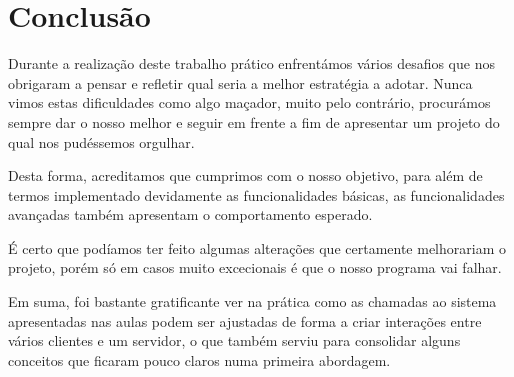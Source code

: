 \documentclass[12pt,a4paper]{report}
\begin{document}
\chapter{Conclusão}

    Durante a realização deste trabalho prático enfrentámos vários desafios que nos obrigaram a pensar e refletir qual seria a melhor estratégia a adotar. Nunca vimos estas dificuldades como algo maçador, muito pelo contrário, procurámos sempre dar o nosso melhor e seguir em frente a fim de apresentar um projeto do qual nos pudéssemos orgulhar.

    Desta forma, acreditamos que cumprimos com o nosso objetivo, para além de termos implementado devidamente as funcionalidades básicas, as funcionalidades avançadas também apresentam o comportamento esperado.

    É certo que podíamos ter feito algumas alterações que certamente melhorariam o projeto, porém só em casos muito excecionais é que o nosso programa vai falhar.

    Em suma, foi bastante gratificante ver na prática como as chamadas ao sistema apresentadas nas aulas podem ser ajustadas de forma a criar interações entre vários clientes e um servidor, o que também serviu para consolidar alguns conceitos que ficaram pouco claros numa primeira abordagem.
\end{document}

